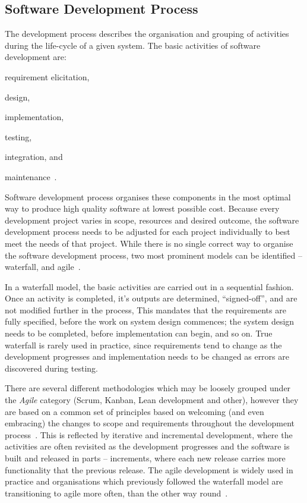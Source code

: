 \subsection{Software Development Process}

The development process describes the organisation and grouping of activities during the life-cycle of a given system. The basic activities of software development are:
% 
\begin{enumerate*}[label=(\roman*)]
    \item requirement elicitation,
    \item design,
    \item implementation,
    \item testing,
    \item integration, and
    \item maintenance~\cite{Sommerville2011SoftwareEngineering, CMS2005SelectingApproach}.
\end{enumerate*}
% 
Software development process organises these components in the most optimal way to produce high quality software at lowest possible cost. Because every development project varies in scope, resources and desired outcome, the software development process needs to be adjusted for each project individually to best meet the needs of that project. While there is no single correct way to organise the software development process, two most prominent models can be identified -- waterfall, and agile~\cite{Sommerville2011SoftwareEngineering}.

In a waterfall model, the basic activities are carried out in a sequential fashion. Once an activity is completed, it's outputs are determined, ``signed-off'', and are not modified further in the process, This mandates that the requirements are fully specified, before the work on system design commences; the system design needs to be completed, before implementation can begin, and so on. True waterfall is rarely used in practice, since requirements tend to change as the development progresses and implementation needs to be changed as errors are discovered during testing.

There are several different methodologies which may be loosely grouped under the \textit{Agile} category (Scrum, Kanban, Lean development and other), however they are based on a common set of principles based on welcoming (and even embracing) the changes to scope and requirements throughout the development process~\cite{KentBeck2001ManifestoDevelopment}. This is reflected by iterative and incremental development, where the activities are often revisited as the development progresses and the software is built and released in parts -- increments, where each new release carries more functionality that the previous release. The agile development is widely used in practice and organisations which previously followed the waterfall model are transitioning to agile more often, than the other way round~\cite{Sommerville2011SoftwareEngineering}.

